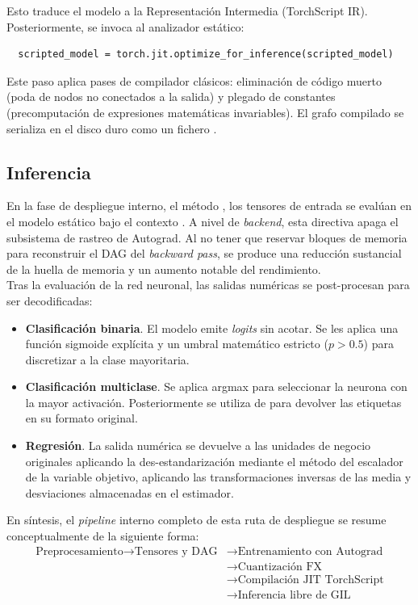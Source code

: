 \documentclass[a4paper,12pt,twoside,final]{book}
\begin{document}
Esto traduce el modelo a la Representación Intermedia (TorchScript IR). Posteriormente, se invoca al analizador
estático:
\begin{verbatim}
  scripted_model = torch.jit.optimize_for_inference(scripted_model)
\end{verbatim}

Este paso aplica pases de compilador clásicos: eliminación de código muerto (poda de nodos no conectados a la salida) y
plegado de constantes (precomputación de expresiones matemáticas invariables). El grafo compilado se serializa en el
disco duro como un fichero .

\subsection{Inferencia}
En la fase de despliegue interno, el método , los tensores de entrada se evalúan en el modelo
estático bajo el contexto . A nivel de \textit{backend}, esta directiva apaga el subsistema
de rastreo de Autograd. Al no tener que reservar bloques de memoria para reconstruir el DAG del \textit{backward pass},
se produce una reducción sustancial de la huella de memoria y un aumento notable del rendimiento.\\

Tras la evaluación de la red neuronal, las salidas numéricas se post-procesan para ser decodificadas:
\begin{itemize}
  \item \textbf{Clasificación binaria}. El modelo emite \textit{logits} sin acotar. Se les aplica una función sigmoide
  explícita y un umbral matemático estricto ($p > 0.5$) para discretizar a la clase mayoritaria.
  \item \textbf{Clasificación multiclase}. Se aplica argmax para seleccionar la neurona con la mayor activación. 
  Posteriormente se utiliza  de  para devolver las etiquetas en su formato
  original.
  \item \textbf{Regresión}. La salida numérica se devuelve a las unidades de negocio originales aplicando la
  des-estandarización mediante el método  del escalador de la variable objetivo, aplicando las
  transformaciones inversas de las media y desviaciones almacenadas en el estimador.
\end{itemize}

En síntesis, el \textit{pipeline} interno completo de esta ruta de despliegue se resume conceptualmente de la siguiente
forma:
\begin{align*}
  \text{Preprocesamiento} \rightarrow \text{Tensores y DAG} &\rightarrow \text{Entrenamiento con Autograd} \\
  & \rightarrow \text{Cuantización FX} \\
  & \rightarrow \text{Compilación JIT TorchScript} \\
  & \rightarrow \text{Inferencia libre de GIL}
\end{align*}
\end{document}
